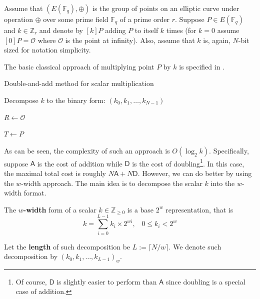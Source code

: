\documentclass{iacrtrans}
\begin{document}
Assume that $(E(\mathbb{F}_q), \oplus)$ is the group of points on an elliptic curve under operation $\oplus$ over some prime field $\mathbb{F}_q$ of a prime order $r$. Suppose $P \in E(\mathbb{F}_q)$ and $k \in \mathbb{Z}_r$ and denote by $[k]P$ adding $P$ to itself $k$ times (for $k=0$ assume $[0]P = \mathcal{O}$ where $\mathcal{O}$ is the point at infinity). Also, assume that $k$ is, again, $N$-bit sized for notation simplicity.

The basic classical approach of multiplying point $P$ by $k$ is specified in . 

\begin{algorithm}
\caption{Double-and-add method for scalar multiplication}\label{alg:double_and_add}

Decompose $k$ to the binary form: $(k_0,k_1,\dots,k_{N-1})$

$R \gets \mathcal{O}$

$T \gets P$



\end{algorithm}

As can be seen, the complexity of such an approach is $O(\log_2k)$. Specifically, suppose $\mathsf{A}$ is the cost of addition while $\mathsf{D}$ is the cost of doubling\footnote{Of course, $\mathsf{D}$ is slightly easier to perform than $\mathsf{A}$ since doubling is a special case of addition.}. In this case, the maximal total cost is roughly $N\mathsf{A} + N\mathsf{D}$. However, we can do better by using the $w$-width approach. The main idea is to decompose the scalar $k$ into the $w$-width format. 
\begin{definition}
The \textbf{$w$-width} form of a scalar $k \in \mathbb{Z}_{\geq 0}$ is a base $2^w$ representation, that is
\begin{equation}
    k = \sum_{i=0}^{L-1}k_i\times 2^{wi}, \;\;\; 0 \leq k_i < 2^w 
\end{equation}

Let the \textbf{length} of such decomposition be $L := \lceil N/w \rceil$. We denote such decomposition by $(k_0,k_1,\dots,k_{L-1})_w$.
\end{definition}
\end{document}
